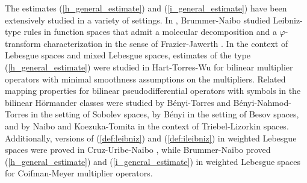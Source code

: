 The estimates (\ref{h_general_estimate}) and (\ref{i_general_estimate}) have been extensively studied in a variety of settings. In \cite{MR3750234}, Brummer-Naibo studied Leibniz-type rules in function spaces that admit a molecular decomposition and a $\varphi$-transform characterization in the sense of Frazier-Jawerth \cite{MR808825, MR1070037}. In the context of Lebesgue spaces and mixed Lebesgue spaces, estimates of the type (\ref{h_general_estimate}) were studied in Hart-Torres-Wu \cite{HTW} for bilinear multiplier operators with minimal smoothness assumptions on the multipliers. Related mapping properties for bilinear pseudodifferential operators with symbols in the bilinear H\"ormander classes were studied by B\'enyi-Torres \cite{MR1986065} and B\'enyi-Nahmod-Torres \cite{MR2250054} in the setting of Sobolev spaces, by B\'enyi \cite{MR1996120} in the setting of Besov spaces, and by Naibo \cite{MR3393696} and Koezuka-Tomita \cite{MR3750316} in the context of Triebel-Lizorkin spaces. Additionally, versions of (\ref{def:leibniz}) and (\ref{def:ileibniz}) in weighted Lebesgue spaces were proved in Cruz-Uribe-Naibo \cite{MR3513582}, while Brummer-Naibo \cite{BrNa2017} proved (\ref{h_general_estimate}) and (\ref{i_general_estimate}) in weighted Lebesgue spaces for Coifman-Meyer multiplier operators. 


%
%
%



